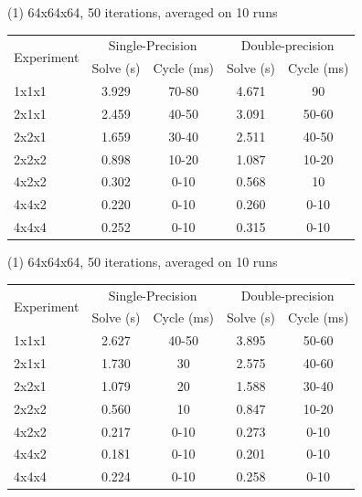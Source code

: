 \documentclass[a4paper,10pt]{article}
\begin{document}
   (1) 64x64x64, 50 iterations, averaged on 10 runs\\
   \begin{tabular}{|l|c|c|c|c|}
   \hline
    \multirow{2}{*}{Experiment} & \multicolumn{2}{c|}{Single-Precision} & \multicolumn{2}{c|}{Double-precision} \\
    \cline{2-5}
    & Solve (s) & Cycle (ms) & Solve (s) & Cycle (ms) \\
    \hline
    1x1x1 & 3.929 & 70-80 & 4.671 & 90 \\
    \hline
    2x1x1 & 2.459 & 40-50 & 3.091 & 50-60\\
    \hline
    2x2x1 & 1.659 & 30-40 & 2.511 & 40-50 \\
    \hline
    2x2x2 & 0.898 & 10-20 & 1.087 & 10-20 \\
    \hline
    4x2x2 & 0.302 & 0-10 & 0.568 & 10 \\
    \hline
    4x4x2 & 0.220 & 0-10 & 0.260 & 0-10 \\
    \hline
    4x4x4 & 0.252 & 0-10 & 0.315 & 0-10 \\
    \hline
   \end{tabular}
   
   (1) 64x64x64, 50 iterations, averaged on 10 runs\\
   \begin{tabular}{|l|c|c|c|c|}
   \hline
    \multirow{2}{*}{Experiment} & \multicolumn{2}{c|}{Single-Precision} & \multicolumn{2}{c|}{Double-precision} \\
    \cline{2-5}
    & Solve (s) & Cycle (ms) & Solve (s) & Cycle (ms) \\
    \hline
    1x1x1 & 2.627 & 40-50 & 3.895 & 50-60\\
    \hline
    2x1x1 & 1.730 & 30 & 2.575 & 40-60\\
    \hline
    2x2x1 & 1.079 & 20 & 1.588 & 30-40 \\
    \hline
    2x2x2 & 0.560 & 10 & 0.847 & 10-20 \\
    \hline
    4x2x2 & 0.217 & 0-10 & 0.273 & 0-10 \\
    \hline
    4x4x2 & 0.181 & 0-10 & 0.201 & 0-10 \\
    \hline
    4x4x4 & 0.224 & 0-10 & 0.258 & 0-10 \\
    \hline
   \end{tabular}
   
   
\end{document}
